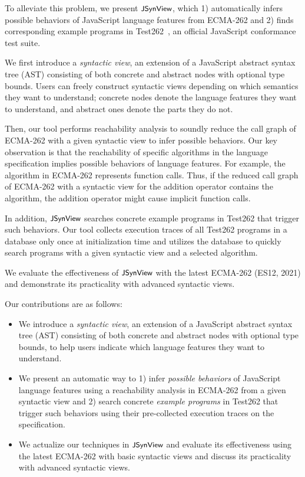 To alleviate this problem, we present $\textsf{\small JSynView}$, which 1) automatically infers
possible behaviors of JavaScript language features from ECMA-262 and 2) finds
corresponding example programs in Test262~\cite{test262}, an official JavaScript
conformance test suite.

We first introduce a \textit{syntactic view}, an extension of a JavaScript
abstract syntax tree (AST) consisting of both concrete and abstract nodes with
optional type bounds.  Users can freely construct syntactic views depending on
which semantics they want to understand; concrete nodes denote the language
features they want to understand, and abstract ones denote the parts they do
not.

Then, our tool performs reachability analysis to soundly reduce the call graph
of ECMA-262 with a given syntactic view to infer possible behaviors.  Our key
observation is that the reachability of specific algorithms in the language
specification implies possible behaviors of language features.  For example, the
 algorithm in ECMA-262 represents function calls.  Thus, if the
reduced call graph of ECMA-262 with a syntactic view for the addition operator
contains the  algorithm, the addition operator might cause implicit
function calls.

In addition, $\textsf{\small JSynView}$ searches concrete example programs in Test262 that trigger
such behaviors.  Our tool collects execution traces of all Test262 programs in a
database only once at initialization time and utilizes the database to quickly
search programs with a given syntactic view and a selected algorithm.

We evaluate the effectiveness of $\textsf{\small JSynView}$ with the latest ECMA-262 (ES12, 2021)
and demonstrate its practicality with  advanced syntactic views.

Our contributions are as follows:
\begin{itemize}
  \item We introduce a \textit{syntactic view}, an extension of a JavaScript
    abstract syntax tree (AST) consisting of both concrete and abstract nodes
    with optional type bounds, to help users indicate which language features
    they want to understand.

  \item We present an automatic way to 1) infer \textit{possible behaviors} of
    JavaScript language features using a reachability analysis in ECMA-262 from
    a given syntactic view and 2) search concrete \textit{example programs} in
    Test262 that trigger such behaviors using their pre-collected execution
    traces on the specification.

  \item We actualize our techniques in $\textsf{\small JSynView}$ and evaluate its effectiveness
    using the latest ECMA-262 with  basic syntactic views and discuss
    its practicality with  advanced syntactic views.
\end{itemize}
